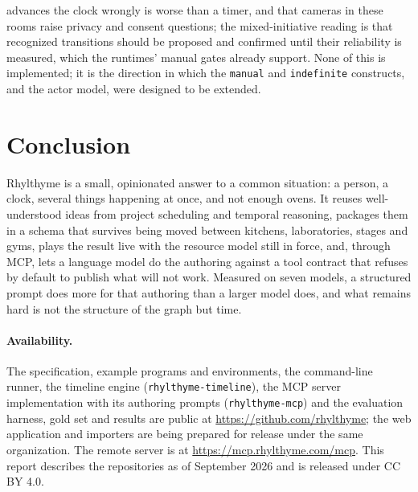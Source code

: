 \documentclass[10pt]{article}
\newcommand{\rt}{Rhylthyme}
\newcommand{\code}[1]{\texttt{#1}}
\begin{document}
advances the clock wrongly is worse than a timer, and that cameras in these rooms raise privacy and consent questions; the mixed-initiative reading is that recognized transitions should be proposed and confirmed until their reliability is measured, which the runtimes' manual gates already support. None of this is implemented; it is the direction in which the \code{manual} and \code{indefinite} constructs, and the actor model, were designed to be extended.

\section{Conclusion}

\rt{} is a small, opinionated answer to a common situation: a person, a clock, several things happening at once, and not enough ovens. It reuses well-understood ideas from project scheduling and temporal reasoning, packages them in a schema that survives being moved between kitchens, laboratories, stages and gyms, plays the result live with the resource model still in force, and, through MCP, lets a language model do the authoring against a tool contract that refuses by default to publish what will not work. Measured on seven models, a structured prompt does more for that authoring than a larger model does, and what remains hard is not the structure of the graph but time.

\paragraph{Availability.} The specification, example programs and environments, the command-line runner, the timeline engine (\code{rhylthyme-timeline}), the MCP server implementation with its authoring prompts (\code{rhylthyme-mcp}) and the evaluation harness, gold set and results are public at \url{https://github.com/rhylthyme}; the web application and importers are being prepared for release under the same organization. The remote server is at \url{https://mcp.rhylthyme.com/mcp}. This report describes the repositories as of September 2026 and is released under CC BY 4.0.



\end{document}
